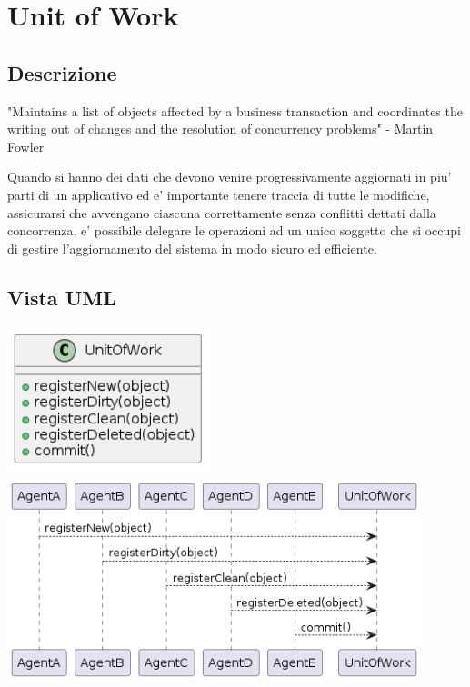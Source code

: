 \chapter{Unit of Work}

\section{Descrizione}

"Maintains a list of objects affected by a business transaction and coordinates the writing out of changes and the resolution of concurrency problems" - Martin Fowler

Quando si hanno dei dati che devono venire progressivamente aggiornati in piu' parti di un applicativo ed e' importante tenere traccia di tutte le modifiche, assicurarsi che avvengano ciascuna correttamente senza conflitti dettati dalla concorrenza, e' possibile delegare le operazioni ad un unico soggetto che si occupi di gestire l'aggiornamento del sistema in modo sicuro ed efficiente.

\section{Vista UML}

\begin{center}
    \includegraphics[width=6cm]{images/unit-of-work/UnitOfWorkClass.png}
    \includegraphics[width=12cm]{images/unit-of-work/UnitOfWorkSD.png}
\end{center}

